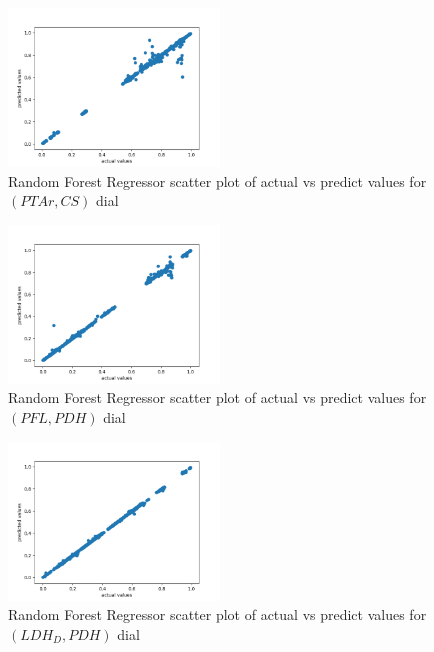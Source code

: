 \documentclass[12pt,chapterheads]{ucsd}
\begin{document}
\begin{figure}[h] 
\centering
\includegraphics[width=0.5\textwidth]{PTAr_CS_rfr}
\caption[Random Forest Regressor scatter plot of actual vs predict values for $(PTAr, CS)$ dial]
{Random Forest Regressor scatter plot of actual vs predict values for $(PTAr, CS)$ dial}
\label{fig:PtarCsRfr}
\end{figure}

\begin{figure}[h] 
\centering
\includegraphics[width=0.5\textwidth]{PFL_PDH_rfr}
\caption[Random Forest Regressor scatter plot of actual vs predict values for $(PFL, PDH)$ dial]
{Random Forest Regressor scatter plot of actual vs predict values for $(PFL, PDH)$ dial}
\label{fig:PflPdhRfr}
\end{figure}

\begin{figure}[h] 
\centering
\includegraphics[width=0.5\textwidth]{LDH_D_PDH_rfr}
\caption[Random Forest scatter plot of actual vs predict values for \string(LDH\textunderscore D, PDH) dial]
{Random Forest Regressor scatter plot of actual vs predict values for $(LDH_D, PDH)$ dial}
\label{fig:LdhPdhRfr}
\end{figure}
\end{document}
